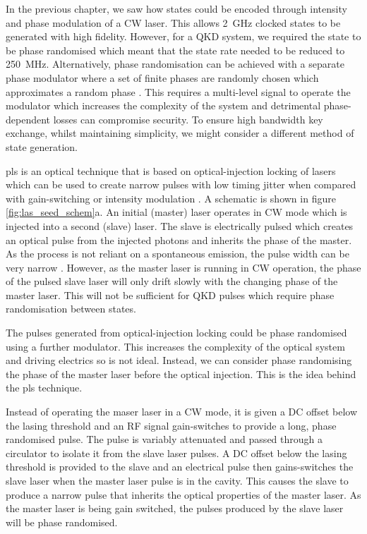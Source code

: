 In the previous chapter, we saw how states could be encoded through intensity and phase modulation of a \ac{CW} laser. This allows \SI{2}{GHz} clocked states to be generated with high fidelity. However, for a \ac{QKD} system, we required the state to be phase randomised which meant that the state rate needed to be reduced to \SI{250}{MHz}. Alternatively, phase randomisation can be achieved with a separate phase modulator where a set of finite phases are randomly chosen which approximates a random phase \cite{Sibson2017InP}. This requires a multi-level signal to operate the modulator which increases the complexity of the system and detrimental phase-dependent losses can compromise security. To ensure high bandwidth key exchange, whilst maintaining simplicity, we might consider a different method of state generation.

\Ac{pls} is an optical technique that is based on optical-injection locking of lasers which can be used to create narrow pulses with low timing jitter when compared with gain-switching or intensity modulation \cite{Seo1996, Gunning1996}. A schematic is shown in figure \ref{fig:las_seed_schem}a. An initial (master) laser operates in \ac{CW} mode which is injected into a second (slave) laser. The slave is electrically pulsed which creates an optical pulse from the injected photons and inherits the phase of the master. As the process is not reliant on a spontaneous emission, the pulse width can be very narrow \cite{Comandar2016PLS}. However, as the master laser is running in \ac{CW} operation, the phase of the pulsed slave laser will only drift slowly with the changing phase of the master laser. This will not be sufficient for \ac{QKD} pulses which require phase randomisation between states. 


The pulses generated from optical-injection locking could be phase randomised using a further modulator. This increases the complexity of the optical system and driving electrics so is not ideal. Instead, we can consider phase randomising the phase of the master laser before the optical injection. This is the idea behind the \ac{pls} technique.

Instead of operating the maser laser in a \ac{CW} mode, it is given a DC offset below the lasing threshold and an RF signal gain-switches to provide a long, phase randomised pulse. The pulse is variably attenuated and passed through a circulator to isolate it from the slave laser pulses. A DC offset below the lasing threshold is provided to the slave and an electrical pulse then gains-switches the slave laser when the master laser pulse is in the cavity. This causes the slave to produce a narrow pulse that inherits the optical properties of the master laser. As the master laser is being gain switched, the pulses produced by the slave laser will be phase randomised.

